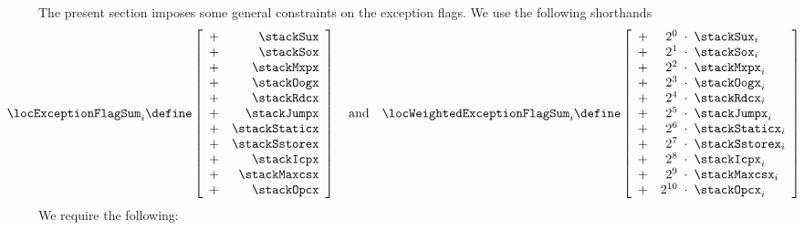 \begin{center}
\end{center}

\noindent The present section imposes some general constraints on the exception flags. We use the following shorthands
\[
	\hspace*{-1.5cm}
	\locExceptionFlagSum_{i}
	\define
	\left[ \begin{array}{cr}
		+ & \stackSux     \\
		+ & \stackSox     \\
		+ & \stackMxpx    \\
		+ & \stackOogx    \\
		+ & \stackRdcx    \\
		+ & \stackJumpx   \\
		+ & \stackStaticx \\
		+ & \stackSstorex \\
		+ & \stackIcpx    \\
		+ & \stackMaxcsx  \\
		+ & \stackOpcx    \\
	\end{array} \right]
	\quad\text{and}\quad
	\locWeightedExceptionFlagSum_{i}
	\define
	\left[ \begin{array}{crcl}
		+ & 2^{ 0} & \!\!\!\cdot\!\!\! & \stackSux     _{i} \\
		+ & 2^{ 1} & \!\!\!\cdot\!\!\! & \stackSox     _{i} \\
		+ & 2^{ 2} & \!\!\!\cdot\!\!\! & \stackMxpx    _{i} \\
		+ & 2^{ 3} & \!\!\!\cdot\!\!\! & \stackOogx    _{i} \\
		+ & 2^{ 4} & \!\!\!\cdot\!\!\! & \stackRdcx    _{i} \\
		+ & 2^{ 5} & \!\!\!\cdot\!\!\! & \stackJumpx   _{i} \\
		+ & 2^{ 6} & \!\!\!\cdot\!\!\! & \stackStaticx _{i} \\
		+ & 2^{ 7} & \!\!\!\cdot\!\!\! & \stackSstorex _{i} \\
		+ & 2^{ 8} & \!\!\!\cdot\!\!\! & \stackIcpx    _{i} \\
		+ & 2^{ 9} & \!\!\!\cdot\!\!\! & \stackMaxcsx  _{i} \\
		+ & 2^{10} & \!\!\!\cdot\!\!\! & \stackOpcx    _{i} \\
	\end{array} \right]
\]
We require the following:
